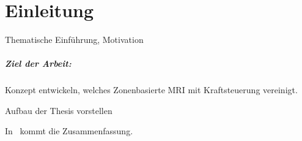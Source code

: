 \chapter{Einleitung}\label{ch:introduction}
Thematische Einführung, Motivation

\paragraph{Ziel der Arbeit:} Konzept entwickeln, welches Zonenbasierte MRI mit Kraftsteuerung vereinigt.

Aufbau der Thesis vorstellen

In~ kommt die Zusammenfassung.
